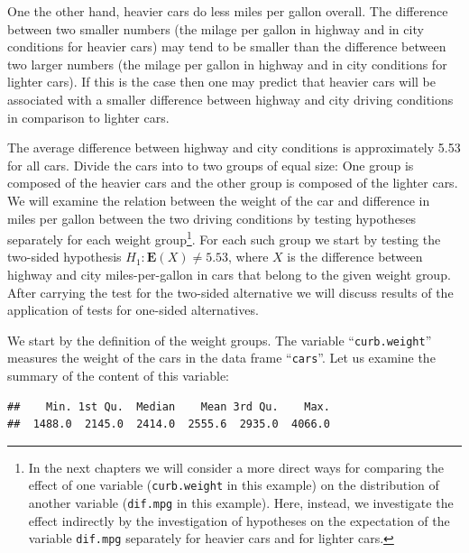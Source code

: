 \documentclass[]{krantz}
\makeatletter
\newenvironment{Shaded}{\begin{snugshade}}{\end{snugshade}}
\newcommand{\KeywordTok}[1]{\textcolor[rgb]{0.13,0.29,0.53}{\textbf{#1}}}
\newcommand{\NormalTok}[1]{#1}
\newcommand{\OperatorTok}[1]{\textcolor[rgb]{0.81,0.36,0.00}{\textbf{#1}}}
\newcommand{\Expec}{\mathbf{E}}
\newenvironment{kframe}{%
\medskip{}
\setlength{\fboxsep}{.8em}
 \def\at@end@of@kframe{}%
 \ifinner\ifhmode%
  \def\at@end@of@kframe{\end{minipage}}%
  \begin{minipage}{\columnwidth}%
 \fi\fi%
 \def\FrameCommand##1{\hskip\@totalleftmargin \hskip-\fboxsep
 \colorbox{shadecolor}{##1}\hskip-\fboxsep
     \hskip-\linewidth \hskip-\@totalleftmargin \hskip\columnwidth}%
 \MakeFramed {\advance\hsize-\width
   \@totalleftmargin\z@ \linewidth\hsize
   \@setminipage}}%
 {\par\unskip\endMakeFramed%
 \at@end@of@kframe}
\renewenvironment{Shaded}{\begin{kframe}}{\end{kframe}}
\theoremstyle{definition}
\theoremstyle{definition}
\theoremstyle{definition}
\theoremstyle{remark}
\makeatother
\begin{document}
One the other hand, heavier cars do less miles per gallon overall. The
difference between two smaller numbers (the milage per gallon in highway
and in city conditions for heavier cars) may tend to be smaller than the
difference between two larger numbers (the milage per gallon in highway
and in city conditions for lighter cars). If this is the case then one
may predict that heavier cars will be associated with a smaller
difference between highway and city driving conditions in comparison to
lighter cars.

The average difference between highway and city conditions is
approximately 5.53 for all cars. Divide the cars into to two groups of
equal size: One group is composed of the heavier cars and the other
group is composed of the lighter cars. We will examine the relation
between the weight of the car and difference in miles per gallon between
the two driving conditions by testing hypotheses separately for each
weight group\footnote{In the next chapters we will consider a more direct ways for
  comparing the effect of one variable (\texttt{curb.weight} in this example)
  on the distribution of another variable (\texttt{dif.mpg} in this example).
  Here, instead, we investigate the effect indirectly by the
  investigation of hypotheses on the expectation of the variable
  \texttt{dif.mpg} separately for heavier cars and for lighter cars.}. For each such group we start by testing the two-sided
hypothesis \(H_1:\Expec(X) \not = 5.53\), where \(X\) is the difference
between highway and city miles-per-gallon in cars that belong to the
given weight group. After carrying the test for the two-sided
alternative we will discuss results of the application of tests for
one-sided alternatives.

We start by the definition of the weight groups. The variable
``\texttt{curb.weight}'' measures the weight of the cars in the data frame
``\texttt{cars}''. Let us examine the summary of the content of this variable:

\begin{Shaded}
\end{Shaded}

\begin{verbatim}
##    Min. 1st Qu.  Median    Mean 3rd Qu.    Max. 
##  1488.0  2145.0  2414.0  2555.6  2935.0  4066.0
\end{verbatim}
\end{document}
